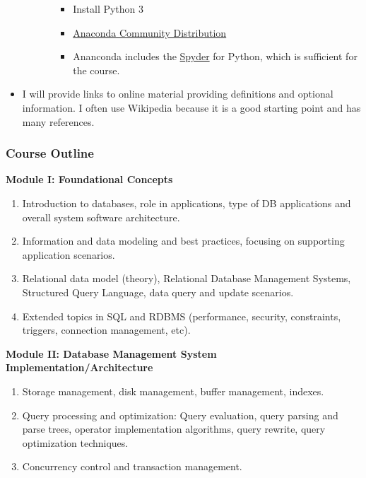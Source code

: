 \documentclass[11pt]{article}
\providecommand{\tightlist}{%
      \setlength{\itemsep}{0pt}\setlength{\parskip}{0pt}}
\begin{document}
\begin{itemize}
\begin{itemize}
\begin{itemize}
      \begin{itemize}
      \tightlist
      \item
        Install Python 3
      \item
        \href{https://www.anaconda.com/distribution}{Anaconda Community
        Distribution}
      \item
        Ananconda includes the
        \href{https://github.com/spyder-ide/spyder}{Spyder} for Python,
        which is sufficient for the course.
      \end{itemize}
    \end{itemize}
  \end{itemize}
\item
  I will provide links to online material providing definitions and
  optional information. I often use Wikipedia because it is a good
  starting point and has many references.
\end{itemize}

    \subsubsection{Course Outline}\label{course-outline}

\textbf{Module I: Foundational Concepts}

\begin{enumerate}
\def\labelenumi{\arabic{enumi}.}
\item
  Introduction to databases, role in applications, type of DB
  applications and overall system software architecture.
\item
  Information and data modeling and best practices, focusing on
  supporting application scenarios.
\item
  Relational data model (theory), Relational Database Management
  Systems, Structured Query Language, data query and update scenarios.
\item
  Extended topics in SQL and RDBMS (performance, security, constraints,
  triggers, connection management, etc).
\end{enumerate}

\textbf{Module II: Database Management System
Implementation/Architecture}

\begin{enumerate}
\def\labelenumi{\arabic{enumi}.}
\setcounter{enumi}{4}
\item
  Storage management, disk management, buffer management, indexes.
\item
  Query processing and optimization: Query evaluation, query parsing and
  parse trees, operator implementation algorithms, query rewrite, query
  optimization techniques.
\item
  Concurrency control and transaction management.
\end{enumerate}
\end{document}
